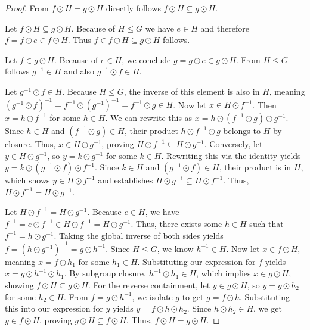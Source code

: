 \begin{proof}
     From $f\odot H=g\odot H$ directly follows $f\odot H\subseteq g\odot H$.
    
     Let $f\odot H\subseteq g\odot H$. Because of $H\leq G$ we have $e\in H$ and therefore $f=f\odot e\in f\odot H$. Thus $f\in f\odot H\subseteq g\odot H$ follows.
    
     Let $f\in g\odot H$. Because of $e\in H$, we conclude $g=g\odot e\in g\odot H$. From $H\leq G$ follows $g^{-1}\in H$ and also $g^{-1}\odot f\in H$.
    
     Let $g^{-1}\odot f\in H$. Because $H \leq G$, the inverse of this element is also in $H$, meaning $(g^{-1}\odot f)^{-1} = f^{-1}\odot (g^{-1})^{-1} = f^{-1}\odot g \in H$. 
    Now let $x \in H\odot f^{-1}$. Then $x = h\odot f^{-1}$ for some $h \in H$. We can rewrite this as $x = h\odot (f^{-1}\odot g)\odot g^{-1}$. Since $h \in H$ and $(f^{-1}\odot g) \in H$, their product $h\odot f^{-1}\odot g$ belongs to $H$ by closure. Thus, $x \in H\odot g^{-1}$, proving $H\odot f^{-1} \subseteq H\odot g^{-1}$. 
    Conversely, let $y \in H\odot g^{-1}$, so $y = k\odot g^{-1}$ for some $k \in H$. Rewriting this via the identity yields $y = k\odot (g^{-1}\odot f)\odot f^{-1}$. Since $k \in H$ and $(g^{-1}\odot f) \in H$, their product is in $H$, which shows $y \in H\odot f^{-1}$ and establishes $H\odot g^{-1} \subseteq H\odot f^{-1}$. Thus, $H\odot f^{-1}=H\odot g^{-1}$.
    
     Let $H\odot f^{-1}=H\odot g^{-1}$. Because $e \in H$, we have $f^{-1} = e\odot f^{-1} \in H\odot f^{-1} = H\odot g^{-1}$. Thus, there exists some $h \in H$ such that $f^{-1} = h\odot g^{-1}$. Taking the global inverse of both sides yields $f = (h\odot g^{-1})^{-1} = g\odot h^{-1}$. Since $H \leq G$, we know $h^{-1} \in H$.
    Now let $x \in f\odot H$, meaning $x = f\odot h_1$ for some $h_1 \in H$. Substituting our expression for $f$ yields $x = g\odot h^{-1}\odot h_1$. By subgroup closure, $h^{-1}\odot h_1 \in H$, which implies $x \in g\odot H$, showing $f\odot H \subseteq g\odot H$.
    For the reverse containment, let $y \in g\odot H$, so $y = g\odot h_2$ for some $h_2 \in H$. From $f = g\odot h^{-1}$, we isolate $g$ to get $g = f\odot h$. Substituting this into our expression for $y$ yields $y = f\odot h\odot h_2$. Since $h\odot h_2 \in H$, we get $y \in f\odot H$, proving $g\odot H \subseteq f\odot H$. Thus, $f\odot H = g\odot H$.
\end{proof}

